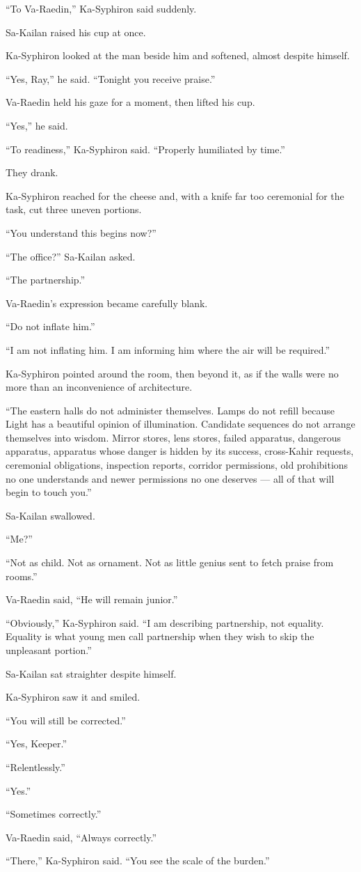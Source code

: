 “To Va-Raedin,” Ka-Syphiron said suddenly.\par
Sa-Kailan raised his cup at once.\par
Ka-Syphiron looked at the man beside him and softened, almost despite himself.\par
“Yes, Ray,” he said. “Tonight you receive praise.”\par
Va-Raedin held his gaze for a moment, then lifted his cup.\par
“Yes,” he said.\par
“To readiness,” Ka-Syphiron said. “Properly humiliated by time.”\par
They drank.\par

Ka-Syphiron reached for the cheese and, with a knife far too ceremonial for the task, cut three uneven portions.\par
“You understand this begins now?”\par
“The office?” Sa-Kailan asked.\par
“The partnership.”\par
Va-Raedin’s expression became carefully blank.\par
“Do not inflate him.”\par
“I am not inflating him. I am informing him where the air will be required.”\par
Ka-Syphiron pointed around the room, then beyond it, as if the walls were no more than an inconvenience of architecture.\par
“The eastern halls do not administer themselves. Lamps do not refill because Light has a beautiful opinion of illumination. 
Candidate sequences do not arrange themselves into wisdom. 
Mirror stores, lens stores, failed apparatus, dangerous apparatus, apparatus whose danger is hidden by its success, cross-Kahir requests, ceremonial obligations, inspection reports, corridor permissions, old prohibitions no one understands and newer permissions no one deserves — all of that will begin to touch you.”\par
Sa-Kailan swallowed.\par
“Me?”\par
“Not as child. Not as ornament. Not as little genius sent to fetch praise from rooms.”\par
Va-Raedin said, “He will remain junior.”\par
“Obviously,” Ka-Syphiron said. “I am describing partnership, not equality. Equality is what young men call partnership when they wish to skip the unpleasant portion.”\par
Sa-Kailan sat straighter despite himself.\par
Ka-Syphiron saw it and smiled.\par
“You will still be corrected.”\par
“Yes, Keeper.”\par
“Relentlessly.”\par
“Yes.”\par
“Sometimes correctly.”\par
Va-Raedin said, “Always correctly.”\par
“There,” Ka-Syphiron said. “You see the scale of the burden.”\par


